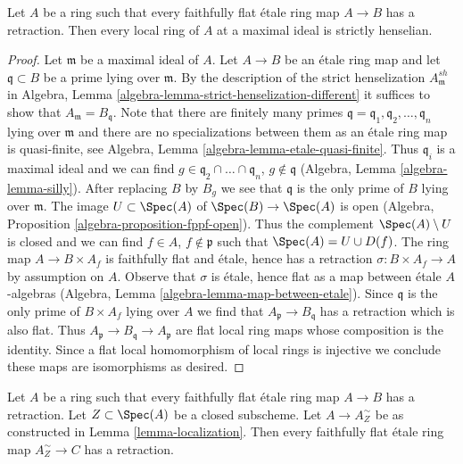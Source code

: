 \begin{lemma}
\label{lemma-have-sections-strictly-henselian}
Let $A$ be a ring such that every faithfully flat \'etale ring map
$A \to B$ has a retraction. Then every local ring of $A$ at a maximal
ideal is strictly henselian.
\end{lemma}

\begin{proof}
Let $\mathfrak m$ be a maximal ideal of $A$. Let $A \to B$ be an
\'etale ring map and let $\mathfrak q \subset B$ be a prime
lying over $\mathfrak m$. By the description of the strict henselization
$A_\mathfrak m^{sh}$ in
Algebra, Lemma \ref{algebra-lemma-strict-henselization-different}
it suffices to show that $A_\mathfrak m = B_\mathfrak q$.
Note that there are finitely many primes
$\mathfrak q = \mathfrak q_1, \mathfrak q_2, \ldots, \mathfrak q_n$
lying over $\mathfrak m$ and there are no specializations
between them as an \'etale ring map is quasi-finite, see
Algebra, Lemma \ref{algebra-lemma-etale-quasi-finite}.
Thus $\mathfrak q_i$ is a maximal ideal and we can find
$g \in \mathfrak q_2 \cap \ldots \cap \mathfrak q_n$, $g \not \in \mathfrak q$
(Algebra, Lemma \ref{algebra-lemma-silly}).
After replacing $B$ by $B_g$ we see that $\mathfrak q$
is the only prime of $B$ lying over $\mathfrak m$.
The image $U \subset \Spec(A)$ of $\Spec(B) \to \Spec(A)$ is
open (Algebra, Proposition \ref{algebra-proposition-fppf-open}).
Thus the complement $\Spec(A) \setminus U$ is closed
and we can find $f \in A$, $f \not \in \mathfrak p$ such that
$\Spec(A) = U \cup D(f)$. The ring map $A \to B \times A_f$
is faithfully flat and \'etale, hence has a retraction
$\sigma : B \times A_f \to A$ by assumption on $A$.
Observe that $\sigma$ is \'etale, hence flat as a map between \'etale
$A$-algebras (Algebra, Lemma \ref{algebra-lemma-map-between-etale}).
Since $\mathfrak q$ is the only prime of $B \times A_f$ lying
over $A$ we find that $A_\mathfrak p \to B_\mathfrak q$ has
a retraction which is also flat. Thus
$A_\mathfrak p \to B_\mathfrak q \to A_\mathfrak p$
are flat local ring maps whose composition is the identity. Since
a flat local homomorphism of local rings is injective we conclude these
maps are isomorphisms as desired.
\end{proof}

\begin{lemma}
\label{lemma-have-sections-localize}
Let $A$ be a ring such that every faithfully flat \'etale ring map
$A \to B$ has a retraction. Let $Z \subset \Spec(A)$ be a closed subscheme.
Let $A \to A_Z^\sim$ be as constructed in Lemma \ref{lemma-localization}.
Then every faithfully flat \'etale ring map $A_Z^\sim \to C$ has
a retraction.
\end{lemma}

